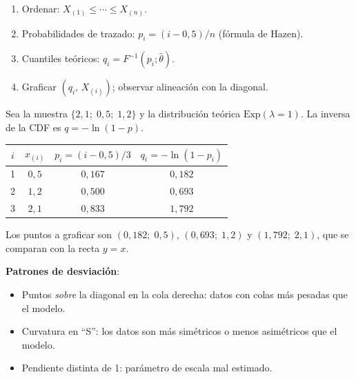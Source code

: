 \documentclass[11pt, letterpaper]{article}
\begin{document}
\begin{metodobox}
\begin{enumerate}
    \item Ordenar: $X_{(1)} \le \cdots \le X_{(n)}$.
    \item Probabilidades de trazado: $p_i = (i-0{,}5)/n$ (fórmula de Hazen).
    \item Cuantiles teóricos: $q_i = F^{-1}(p_i;\hat\theta)$.
    \item Graficar $(q_i,\, X_{(i)})$; observar alineación con la diagonal.
\end{enumerate}
\end{metodobox}

\begin{ejemplobox}[Cálculo manual de un Q-Q exponencial con $n=3$]
Sea la muestra $\{2{,}1;\; 0{,}5;\; 1{,}2\}$ y la distribución teórica $\mathrm{Exp}(\lambda=1)$. La inversa de la CDF es $q = -\ln(1-p)$.

\begin{center}\small
\renewcommand{\arraystretch}{1.25}
\begin{tabular}{cccc}
\toprule
$i$ & $x_{(i)}$ & $p_i=(i-0{,}5)/3$ & $q_i=-\ln(1-p_i)$ \\
\midrule
1 & $0{,}5$ & $0{,}167$ & $0{,}182$ \\
2 & $1{,}2$ & $0{,}500$ & $0{,}693$ \\
3 & $2{,}1$ & $0{,}833$ & $1{,}792$ \\
\bottomrule
\end{tabular}
\end{center}

Los puntos a graficar son $(0{,}182;\; 0{,}5)$, $(0{,}693;\; 1{,}2)$ y $(1{,}792;\; 2{,}1)$, que se comparan con la recta $y=x$.
\end{ejemplobox}

\textbf{Patrones de desviación}:
\begin{itemize}
    \item Puntos \emph{sobre} la diagonal en la cola derecha: datos con colas más pesadas que el modelo.
    \item Curvatura en ``S'': los datos son más simétricos o menos asimétricos que el modelo.
    \item Pendiente distinta de 1: parámetro de escala mal estimado.
\end{itemize}
\end{document}
